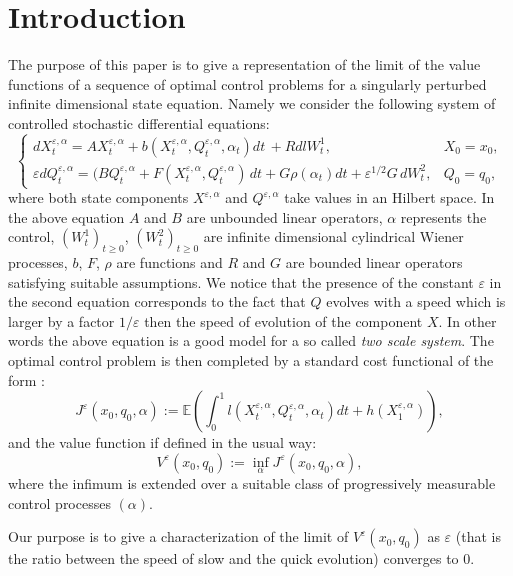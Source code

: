 \documentclass[reqno,a4paper,11 pt]{article}
\def \E {\mathbb{E}}
\def \e {\varepsilon}
\numberwithin{equation}{section}
\begin{document}
\section{Introduction} The purpose of this  paper is to give a representation of  the limit of the value functions of a sequence of optimal control problems for a singularly perturbed infinite dimensional state equation. Namely we consider the following system of controlled stochastic differential equations:
\begin{equation}\begin{cases}\label{controllointro}
dX^{\e,\alpha}_t= AX^{\e,\alpha}_t +  b(X^{\e,\alpha}_t,Q^{\e,\alpha}_t,\alpha_t)dt \,+ Rdl{W}^1_t, & X_0=x_0, \\ 
 \e dQ^{\e,\alpha}_t= (BQ^{\e,\alpha}_t+ F(X^{\e,\alpha}_t,Q^{\e,\alpha}_t) \,dt +  G\rho(\alpha_t)dt+ \e^{1/2} G \, d {W}^2_t, & Q_0=q_0,
\end{cases}
\end{equation}
where both state components $X^{\e,\alpha}$ and $Q^{\e,\alpha}$  take values in an Hilbert space. In the above equation $A$ and $B$ are unbounded linear operators, $\alpha$ represents the control, $  ({W}^1_t)_{t\geq 0}$,  $  ({W}^2_t)_{t\geq 0}$ are infinite dimensional cylindrical Wiener processes, $b$, $F$, $\rho$ are functions  and $R$ and $G$ are bounded linear operators satisfying suitable assumptions. We notice that the presence of the constant $\e$ in the second equation corresponds to the fact that $Q$ evolves with a speed which is larger by a factor $1/\e$ then the speed of evolution of the component $X$. In other words the above equation is a good model for a so called \textit{two scale system}. The optimal control problem is then completed by a standard cost functional of the form
:
\begin{equation} \label{costointro}J^{\e}(x_0,q_0,\alpha):=\E\left( \int_0^1 l(X^{\e,\alpha}_t, Q^{\e,\alpha}_t, \alpha_t)dt + h (X^{\e,\alpha}_1)\right),\end{equation}
and the value function if defined in the usual way:
\begin{equation}\label{intro-vf}
V^{\e}(x_0,q_0):=\inf_{\alpha} J^{\e}(x_0,q_0,\alpha),
\end{equation}
where the infimum is extended over a suitable class of progressively measurable control processes $(\alpha)$.  

Our purpose is to give a characterization of the limit of $V^{\e}(x_0,q_0)$ as $\e$ (that is the ratio between the speed of slow and the quick evolution) converges to $0$.
\end{document}
